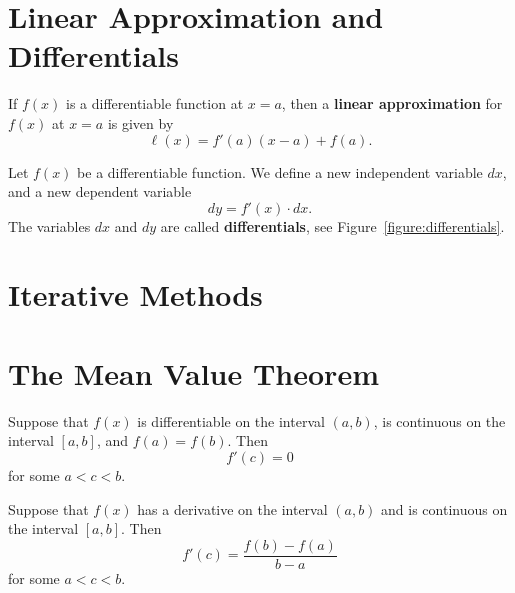 \documentclass{ximera}
\renewcommand{\l}{\ell}
\begin{document}
\section{Linear Approximation and Differentials}






\begin{definition}
If $f(x)$ is a differentiable function at $x=a$, then a \textbf{linear
approximation} for $f(x)$ at $x=a$ is given by
\[
\l(x) = f'(a)(x-a) +f(a).
\]
\end{definition}



\begin{definition}  %
Let $f(x)$ be a differentiable function. We define a new
independent variable $dx$, and a new dependent variable
\[
dy=f'(x)\cdot dx.
\]
The variables $dx$ and $dy$ are called \textbf{differentials}, see
Figure~\ref{figure:differentials}.
\end{definition}







\section{Iterative Methods}








\section{The Mean Value Theorem}







\begin{theorem}
Suppose that $f(x)$ is differentiable on the interval $(a,b)$, is
continuous on the interval $[a,b]$, and $f(a)=f(b)$. Then
\[
f'(c)=0
\]
for some $a<c<b$.
\label{thm:rolle}
\end{theorem}




\begin{theorem}\label{thm:mvt}
Suppose that $f(x)$ has a derivative on the interval $(a,b)$ and is
continuous on the interval $[a,b]$. Then
\[
f'(c)=\frac{f(b)-f(a)}{b-a}
\]
for some $a<c<b$.
\end{theorem}
\end{document}
